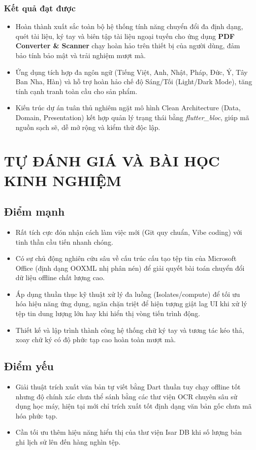 \documentclass[12pt, a4paper]{article}
\begin{document}
\subsubsection{Kết quả đạt được}
\begin{itemize}
    \item Hoàn thành xuất sắc toàn bộ hệ thống tính năng chuyển đổi đa định dạng, quét tài liệu, ký tay và biên tập tài liệu ngoại tuyến cho ứng dụng \textbf{PDF Converter \& Scanner} chạy hoàn hảo trên thiết bị của người dùng, đảm bảo tính bảo mật và trải nghiệm mượt mà.
    \item Ứng dụng tích hợp đa ngôn ngữ (Tiếng Việt, Anh, Nhật, Pháp, Đức, Ý, Tây Ban Nha, Hàn) và hỗ trợ hoàn hảo chế độ Sáng/Tối (Light/Dark Mode), tăng tính cạnh tranh toàn cầu cho sản phẩm.
    \item Kiến trúc dự án tuân thủ nghiêm ngặt mô hình Clean Architecture (Data, Domain, Presentation) kết hợp quản lý trạng thái bằng \textit{flutter\_bloc}, giúp mã nguồn sạch sẽ, dễ mở rộng và kiểm thử độc lập.
\end{itemize}

\section{TỰ ĐÁNH GIÁ VÀ BÀI HỌC KINH NGHIỆM}
\subsection{Điểm mạnh}
\begin{itemize}
    \item Rất tích cực đón nhận cách làm việc mới (Git quy chuẩn, Vibe coding) với tinh thần cầu tiến nhanh chóng.
    \item Có sự chủ động nghiên cứu sâu về cấu trúc cấu tạo tệp tin của Microsoft Office (định dạng OOXML nhị phân nén) để giải quyết bài toán chuyển đổi dữ liệu offline chất lượng cao.
    \item Áp dụng thuần thục kỹ thuật xử lý đa luồng (Isolates/compute) để tối ưu hóa hiệu năng ứng dụng, ngăn chặn triệt để hiện tượng giật lag UI khi xử lý tệp tin dung lượng lớn hay khi hiển thị vòng tiến trình động.
    \item Thiết kế và lập trình thành công hệ thống chữ ký tay và tương tác kéo thả, xoay chữ ký có độ phức tạp cao hoàn toàn mượt mà.
\end{itemize}
\subsection{Điểm yếu}
\begin{itemize}
    \item Giải thuật trích xuất văn bản tự viết bằng Dart thuần tuy chạy offline tốt nhưng độ chính xác chưa thể sánh bằng các thư viện OCR chuyên sâu sử dụng học máy, hiện tại mới chỉ trích xuất tốt định dạng văn bản gốc chưa mã hóa phức tạp.
    \item Cần tối ưu thêm hiệu năng hiển thị của thư viện Isar DB khi số lượng bản ghi lịch sử lên đến hàng nghìn tệp.
\end{itemize}
\end{document}
